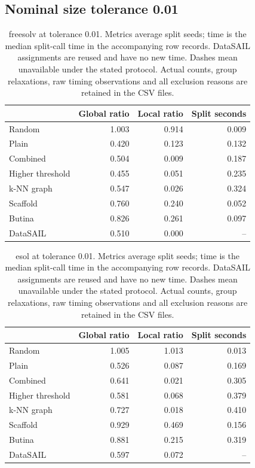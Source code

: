 \subsection*{Nominal size tolerance 0.01}
\begin{table}[htbp]\centering\small
\begin{tabular}{lrrr}
\toprule
 & Global ratio & Local ratio & Split seconds \\
\midrule
Random & 1.003 & 0.914 & 0.009 \\
Plain & 0.420 & 0.123 & 0.132 \\
Combined & 0.504 & 0.009 & 0.187 \\
Higher threshold & 0.455 & 0.051 & 0.235 \\
k-NN graph & 0.547 & 0.026 & 0.324 \\
Scaffold & 0.760 & 0.240 & 0.052 \\
Butina & 0.826 & 0.261 & 0.097 \\
DataSAIL & 0.510 & 0.000 & -- \\
\bottomrule
\end{tabular}

\caption{freesolv at tolerance 0.01. Metrics average split seeds; time is the median split-call time in the accompanying row records. DataSAIL assignments are reused and have no new time. Dashes mean unavailable under the stated protocol. Actual counts, group relaxations, raw timing observations and all exclusion reasons are retained in the CSV files.}\end{table}
\begin{table}[htbp]\centering\small
\begin{tabular}{lrrr}
\toprule
 & Global ratio & Local ratio & Split seconds \\
\midrule
Random & 1.005 & 1.013 & 0.013 \\
Plain & 0.526 & 0.087 & 0.169 \\
Combined & 0.641 & 0.021 & 0.305 \\
Higher threshold & 0.581 & 0.068 & 0.379 \\
k-NN graph & 0.727 & 0.018 & 0.410 \\
Scaffold & 0.929 & 0.469 & 0.156 \\
Butina & 0.881 & 0.215 & 0.319 \\
DataSAIL & 0.597 & 0.072 & -- \\
\bottomrule
\end{tabular}

\caption{esol at tolerance 0.01. Metrics average split seeds; time is the median split-call time in the accompanying row records. DataSAIL assignments are reused and have no new time. Dashes mean unavailable under the stated protocol. Actual counts, group relaxations, raw timing observations and all exclusion reasons are retained in the CSV files.}\end{table}
